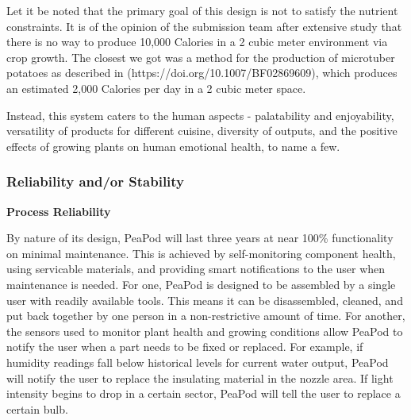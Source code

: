 \documentclass{report}
\begin{document}
Let it be noted that the primary goal of this design is not to satisfy the nutrient constraints. It is of the opinion of the submission team after extensive study that there is no way to produce 10,000 Calories in a 2 cubic meter environment via crop growth. The closest we got was a method for the production of microtuber potatoes as described in (https://doi.org/10.1007/BF02869609), which produces an estimated 2,000 Calories per day in a 2 cubic meter space.

Instead, this system caters to the human aspects - palatability and enjoyability, versatility of products for different cuisine, diversity of outputs, and the positive effects of growing plants on human emotional health, to name a few.


\newpage

\subsubsection{Reliability and/or Stability}

\textbf{Process Reliability}
\label{sec:reliability-process}






By nature of its design, PeaPod will last three years at near 100\% functionality on minimal maintenance.
This is achieved by self-monitoring component health, using servicable materials, and providing smart notifications to the user when maintenance is needed.
For one, PeaPod is designed to be assembled by a single user with readily available tools. This means it can be disassembled, cleaned, and put back together by one person in a non-restrictive amount of time.
For another, the sensors used to monitor plant health and growing conditions allow PeaPod to notify the user when a part needs to be fixed or replaced. For example, if humidity readings fall below historical levels for current water output, PeaPod will notify the user to replace the insulating material in the nozzle area. If light intensity begins to drop in a certain sector, PeaPod will tell the user to replace a certain bulb.
\end{document}

